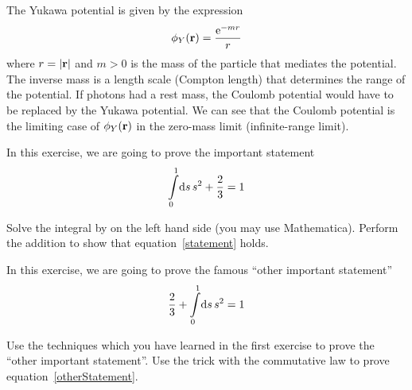 \documentclass{exercise}
\begin{document}
The Yukawa potential is given by the expression
\begin{align}
    \phi_Y(\mathbf{r}) = \frac{\operatorname{e}^{-mr}}{r}
\end{align}
where $r=|\mathbf{r}|$ and $m > 0$ is the mass of the particle that mediates the potential. The inverse mass is a length scale (Compton length) that determines the range of the potential. If photons had a rest mass, the Coulomb potential would have to be replaced by the Yukawa potential. We can see that the Coulomb potential is the limiting case of $\phi_Y(\mathbf{r})$ in the zero-mass limit (infinite-range limit).

\begin{exercises}

In this exercise, we are going to prove the important statement
\begin{align}
    \int\limits_{0}^{1} \! \mathrm{d} s\, s^2 + \frac{2}{3} = 1
    \label{statement}
\end{align}
\begin{tasks}
    \task Solve the integral by on the left hand side (you may use Mathematica).
    \task Perform the addition to show that equation~\eqref{statement} holds.
\end{tasks}

In this exercise, we are going to prove the famous ``other important statement''
\begin{align}
    \frac{2}{3} + \int\limits_{0}^{1} \! \mathrm{d} s\, s^2 = 1
    \label{otherStatement}
\end{align}
\begin{tasks}
    \task Use the techniques which you have learned in the first exercise to prove
          the ``other important statement''.
    \task Use the trick with the commutative law to prove equation~\eqref{otherStatement}.
\end{tasks}

\end{exercises}
\end{document}
